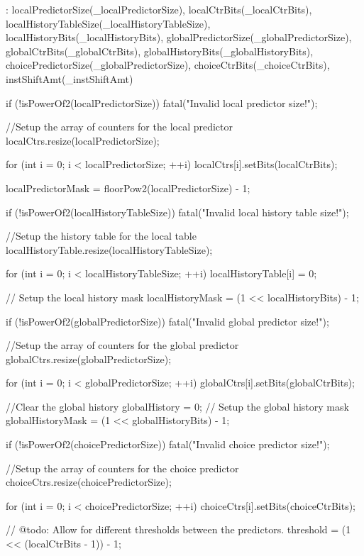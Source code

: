 \begin{DoxyCode}
    : localPredictorSize(_localPredictorSize),
      localCtrBits(_localCtrBits),
      localHistoryTableSize(_localHistoryTableSize),
      localHistoryBits(_localHistoryBits),
      globalPredictorSize(_globalPredictorSize),
      globalCtrBits(_globalCtrBits),
      globalHistoryBits(_globalHistoryBits),
      choicePredictorSize(_globalPredictorSize),
      choiceCtrBits(_choiceCtrBits),
      instShiftAmt(_instShiftAmt)
{
    if (!isPowerOf2(localPredictorSize)) {
        fatal("Invalid local predictor size!\n");
    }

    //Setup the array of counters for the local predictor
    localCtrs.resize(localPredictorSize);

    for (int i = 0; i < localPredictorSize; ++i)
        localCtrs[i].setBits(localCtrBits);

    localPredictorMask = floorPow2(localPredictorSize) - 1;

    if (!isPowerOf2(localHistoryTableSize)) {
        fatal("Invalid local history table size!\n");
    }

    //Setup the history table for the local table
    localHistoryTable.resize(localHistoryTableSize);

    for (int i = 0; i < localHistoryTableSize; ++i)
        localHistoryTable[i] = 0;

    // Setup the local history mask
    localHistoryMask = (1 << localHistoryBits) - 1;

    if (!isPowerOf2(globalPredictorSize)) {
        fatal("Invalid global predictor size!\n");
    }

    //Setup the array of counters for the global predictor
    globalCtrs.resize(globalPredictorSize);

    for (int i = 0; i < globalPredictorSize; ++i)
        globalCtrs[i].setBits(globalCtrBits);

    //Clear the global history
    globalHistory = 0;
    // Setup the global history mask
    globalHistoryMask = (1 << globalHistoryBits) - 1;

    if (!isPowerOf2(choicePredictorSize)) {
        fatal("Invalid choice predictor size!\n");
    }

    //Setup the array of counters for the choice predictor
    choiceCtrs.resize(choicePredictorSize);

    for (int i = 0; i < choicePredictorSize; ++i)
        choiceCtrs[i].setBits(choiceCtrBits);

    // @todo: Allow for different thresholds between the predictors.
    threshold = (1 << (localCtrBits - 1)) - 1;
}
\end{DoxyCode}


